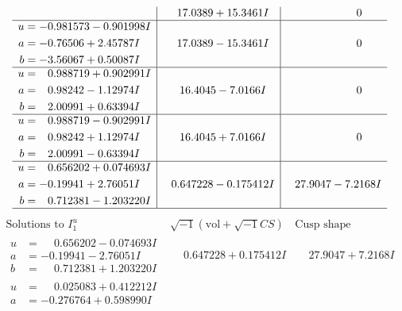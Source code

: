 \documentclass[1p]{elsarticle_modified}
\theoremstyle{definition}
\newcommand{\I}{\sqrt{-1}}
\begin{document}
$$\begin{array}{c|c|c}
 & \phantom{-}17.0389 + 15.3461 I & \phantom{-0.000000 } 0 \\ \hline\begin{aligned}
u &= -0.981573 - 0.901998 I \\
a &= -0.76506 + 2.45787 I \\
b &= -3.56067 + 0.50087 I\end{aligned}
 & \phantom{-}17.0389 - 15.3461 I & \phantom{-0.000000 } 0 \\ \hline\begin{aligned}
u &= \phantom{-}0.988719 + 0.902991 I \\
a &= \phantom{-}0.98242 - 1.12974 I \\
b &= \phantom{-}2.00991 + 0.63394 I\end{aligned}
 & \phantom{-}16.4045 - 7.0166 I & \phantom{-0.000000 } 0 \\ \hline\begin{aligned}
u &= \phantom{-}0.988719 - 0.902991 I \\
a &= \phantom{-}0.98242 + 1.12974 I \\
b &= \phantom{-}2.00991 - 0.63394 I\end{aligned}
 & \phantom{-}16.4045 + 7.0166 I & \phantom{-0.000000 } 0 \\ \hline\begin{aligned}
u &= \phantom{-}0.656202 + 0.074693 I \\
a &= -0.19941 + 2.76051 I \\
b &= \phantom{-}0.712381 - 1.203220 I\end{aligned}
 & \phantom{-}0.647228 - 0.175412 I & \phantom{-}27.9047 - 7.2168 I\\
 \hline 
 \end{array}$$\newpage$$\begin{array}{c|c|c}  
\text{Solutions to }I^u_{1}& \I (\text{vol} + \sqrt{-1}CS) & \text{Cusp shape}\\
 \hline 
\begin{aligned}
u &= \phantom{-}0.656202 - 0.074693 I \\
a &= -0.19941 - 2.76051 I \\
b &= \phantom{-}0.712381 + 1.203220 I\end{aligned}
 & \phantom{-}0.647228 + 0.175412 I & \phantom{-}27.9047 + 7.2168 I \\ \hline\begin{aligned}
u &= \phantom{-}0.025083 + 0.412212 I \\
a &= -0.276764 + 0.598990 I \\

\end{aligned}
\end{array}$$
\end{document}
